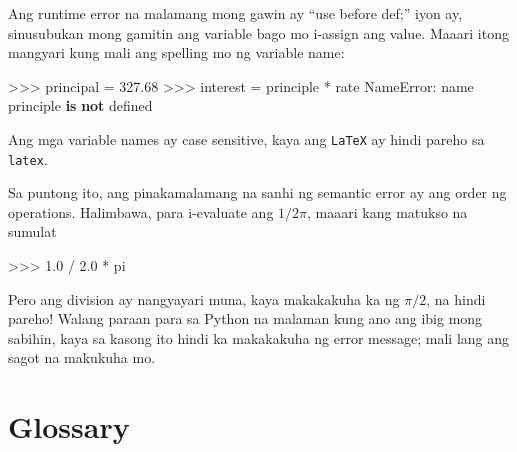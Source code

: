 \documentclass[10pt,]{book}
\newenvironment{Shaded}{}{}
\newcommand{\FloatTok}[1]{\textcolor[rgb]{0.25,0.63,0.44}{#1}}
\newcommand{\KeywordTok}[1]{\textcolor[rgb]{0.00,0.44,0.13}{\textbf{#1}}}
\newcommand{\NormalTok}[1]{#1}
\newcommand{\OperatorTok}[1]{\textcolor[rgb]{0.40,0.40,0.40}{#1}}
\newcommand{\PreprocessorTok}[1]{\textcolor[rgb]{0.74,0.48,0.00}{#1}}
\newcommand{\StringTok}[1]{\textcolor[rgb]{0.25,0.44,0.63}{#1}}
\begin{document}
Ang runtime error na malamang mong gawin ay ``use before def;'' iyon ay,
sinusubukan mong gamitin ang variable bago mo i-assign ang value. Maaari
itong mangyari kung mali ang spelling mo ng variable name:

\begin{Shaded}
\begin{Highlighting}[]
\OperatorTok{\textgreater{}\textgreater{}\textgreater{}}\NormalTok{ principal }\OperatorTok{=} \FloatTok{327.68}
\OperatorTok{\textgreater{}\textgreater{}\textgreater{}}\NormalTok{ interest }\OperatorTok{=}\NormalTok{ principle }\OperatorTok{*}\NormalTok{ rate}
\PreprocessorTok{NameError}\NormalTok{: name }\StringTok{\textquotesingle{}principle\textquotesingle{}} \KeywordTok{is} \KeywordTok{not}\NormalTok{ defined}
\end{Highlighting}
\end{Shaded}

Ang mga variable names ay case sensitive, kaya ang \texttt{LaTeX} ay
hindi pareho sa \texttt{latex}.

 

Sa puntong ito, ang pinakamalamang na sanhi ng semantic error ay ang
order ng operations. Halimbawa, para i-evaluate ang \(1/2\pi\), maaari
kang matukso na sumulat

\begin{Shaded}
\begin{Highlighting}[]
\OperatorTok{\textgreater{}\textgreater{}\textgreater{}} \FloatTok{1.0} \OperatorTok{/} \FloatTok{2.0} \OperatorTok{*}\NormalTok{ pi}
\end{Highlighting}
\end{Shaded}

Pero ang division ay nangyayari muna, kaya makakakuha ka ng \(\pi / 2\),
na hindi pareho! Walang paraan para sa Python na malaman kung ano ang
ibig mong sabihin, kaya sa kasong ito hindi ka makakakuha ng error
message; mali lang ang sagot na makukuha mo.


\section{Glossary}\label{glossary-1}
\end{document}

